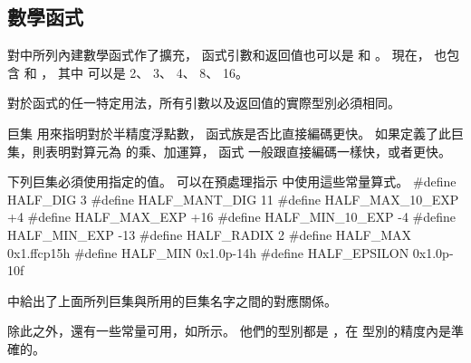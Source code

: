 \subsection{數學函式}

對中所列內建數學函式作了擴充，
函式引數和返回值也可以是  和 。
現在，  也包含  和 ，
其中  可以是 2、 3、 4、 8、 16。

對於函式的任一特定用法，所有引數以及返回值的實際型別必須相同。

{}

巨集  用來指明對於半精度浮點數，
  函式族是否比直接編碼更快。
如果定義了此巨集，則表明對算元為  的乘、加運算，
函式  一般跟直接編碼一樣快，或者更快。

下列巨集必須使用指定的值。
可以在預處理指示  中使用這些常量算式。
\startclc
#define HALF_DIG		3
#define HALF_MANT_DIG		11
#define HALF_MAX_10_EXP		+4
#define HALF_MAX_EXP		+16
#define HALF_MIN_10_EXP		-4
#define HALF_MIN_EXP		-13
#define HALF_RADIX		2
#define HALF_MAX		0x1.ffcp15h
#define HALF_MIN		0x1.0p-14h
#define HALF_EPSILON		0x1.0p-10f
\stopclc

中給出了上面所列巨集與所用的巨集名字之間的對應關係。

{}

除此之外，還有一些常量可用，如所示。
他們的型別都是 ，在  型別的精度內是準確的。

{}
